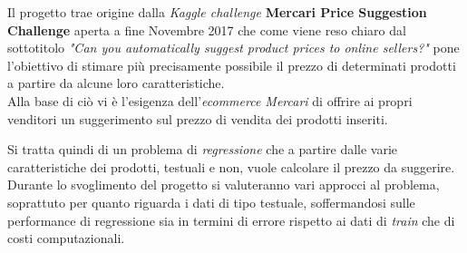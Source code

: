 



Il progetto trae origine dalla \textit{Kaggle challenge} \textbf{Mercari Price
Suggestion Challenge}\cite{mercari-price-suggestion-challenge} aperta a fine
Novembre 2017 che come viene reso chiaro dal sottotitolo \textit{"Can you
automatically suggest product prices to online sellers?"} pone l'obiettivo di
stimare più precisamente possibile il prezzo di determinati prodotti a partire
da alcune loro caratteristiche.
\\
Alla base di ciò vi è l'esigenza dell'\textit{ecommerce Mercari}\cite{mercari}
di offrire ai propri venditori un suggerimento sul prezzo di vendita dei
prodotti inseriti.

Si tratta quindi di un problema di \textit{regressione} che a partire dalle
varie caratteristiche dei prodotti, testuali e non, vuole calcolare il prezzo da
suggerire.
\\
Durante lo svoglimento del progetto si valuteranno vari approcci al problema,
soprattuto per quanto riguarda i dati di tipo testuale, soffermandosi sulle
performance di regressione sia in termini di errore rispetto ai dati di
\textit{train} che di costi computazionali.